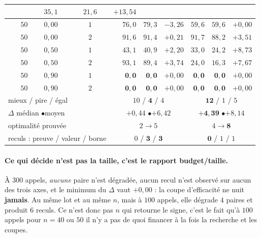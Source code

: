 \documentclass[11pt,a4paper]{article}
\theoremstyle{plain}
\theoremstyle{remark}
\begin{document}
\begin{table}[H]
\begin{tabular}{rcc|rrr|rrr}
                      & $35{,}1$ & $21{,}6$ & $+13{,}54$\\
\midrule
$50$ & $0{,}00$ & $1$ & $76{,}0$ & $79{,}3$ & $-3{,}26$
                      & $59{,}6$ & $59{,}6$ & $+0{,}00$\\
$50$ & $0{,}00$ & $2$ & $91{,}6$ & $91{,}4$ & $+0{,}21$
                      & $91{,}7$ & $88{,}2$ & $+3{,}51$\\
$50$ & $0{,}50$ & $1$ & $43{,}1$ & $40{,}9$ & $+2{,}20$
                      & $33{,}0$ & $24{,}2$ & $+8{,}73$\\
$50$ & $0{,}50$ & $2$ & $93{,}1$ & $89{,}4$ & $+3{,}74$
                      & $24{,}0$ & $16{,}3$ & $+7{,}67$\\
$50$ & $0{,}90$ & $1$ & $\mathbf{0{,}0}$ & $\mathbf{0{,}0}$ & $+0{,}00$
                      & $\mathbf{0{,}0}$ & $\mathbf{0{,}0}$ & $+0{,}00$\\
$50$ & $0{,}90$ & $2$ & $\mathbf{0{,}0}$ & $\mathbf{0{,}0}$ & $+0{,}00$
                      & $\mathbf{0{,}0}$ & $\mathbf{0{,}0}$ & $+0{,}00$\\
\midrule
\multicolumn{3}{l|}{mieux / pire / égal}
 & \multicolumn{3}{c|}{$10$ / $\mathbf{4}$ / $4$}
 & \multicolumn{3}{c}{$\mathbf{12}$ / $1$ / $5$}\\
\multicolumn{3}{l|}{$\Delta$ médian \quad$\bullet$\quad moyen}
 & \multicolumn{3}{c|}{$+0{,}44$ \quad$\bullet$\quad $+6{,}42$}
 & \multicolumn{3}{c}{$\mathbf{+4{,}39}$ \quad$\bullet$\quad $+8{,}14$}\\
\multicolumn{3}{l|}{optimalité prouvée}
 & \multicolumn{3}{c|}{$2\to 5$} & \multicolumn{3}{c}{$4\to\mathbf{8}$}\\
\multicolumn{3}{l|}{reculs : preuve / valeur / borne}
 & \multicolumn{3}{c|}{$0$ / $\mathbf{3}$ / $\mathbf{3}$}
 & \multicolumn{3}{c}{$\mathbf{0}$ / $1$ / $1$}\\
\bottomrule
\end{tabular}
\end{table}

\paragraph{Ce qui décide n'est pas la taille, c'est le rapport
budget/taille.} À $300$ appels, \emph{aucune} paire n'est dégradée, aucun
recul n'est observé sur aucun des trois axes, et le minimum du $\Delta$ vaut
$+0{,}00$ : la coupe d'efficacité ne nuit \textbf{jamais}. Au même lot et au
même $n$, mais à $100$ appels, elle dégrade $4$ paires et produit $6$
reculs. Ce n'est donc pas $n$ qui retourne le signe, c'est le fait qu'à
$100$ appels pour $n=40$ ou $50$ il n'y a pas de quoi financer à la fois la
recherche et les coupes.
\end{document}
